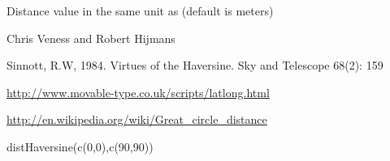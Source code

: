 \begin{Value}
Distance value in the same unit as  (default is meters)
\end{Value}
\begin{Author}\relax
Chris Veness and Robert Hijmans
\end{Author}
\begin{References}\relax
Sinnott, R.W, 1984. Virtues of the Haversine. Sky and Telescope 68(2): 159

\url{http://www.movable-type.co.uk/scripts/latlong.html}

\url{http://en.wikipedia.org/wiki/Great_circle_distance}
\end{References}
\begin{SeeAlso}\relax
{}
\end{SeeAlso}
\begin{Examples}
\begin{ExampleCode}
distHaversine(c(0,0),c(90,90))
\end{ExampleCode}
\end{Examples}

